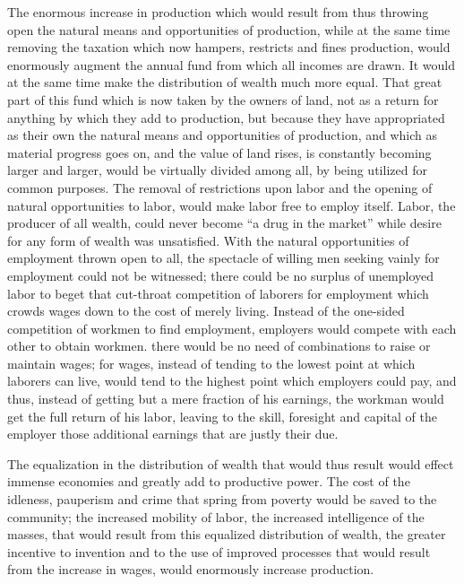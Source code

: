 \documentclass{book}
\begin{document}
The enormous increase in production which would result from thus throwing open the natural means and opportunities of production, while at the same time removing the taxation which now hampers, restricts and fines production, would enormously augment the annual fund from which all incomes are drawn. It would at the same time make the distribution of wealth much more equal. That great part of this fund which is now taken by the owners of land, not as a return for anything by which they add to production, but because they have appropriated as their own the natural means and opportunities of production, and which as material progress goes on, and the value of land rises, is constantly becoming larger and larger, would be virtually divided among all, by being utilized for common purposes. The removal of restrictions upon labor and the opening of natural opportunities to labor, would make labor free to employ itself. Labor, the producer of all wealth, could never become “a drug in the market” while desire for any form of wealth was unsatisfied. With the natural opportunities of employment thrown open to all, the spectacle of willing men seeking vainly for employment could not be witnessed; there could be no surplus of unemployed labor to beget that cut-throat competition of laborers for employment which crowds wages down to the cost of merely living. Instead of the one-sided competition of workmen to find employment, employers would compete with each other to obtain workmen. there would be no need of combinations to raise or maintain wages; for wages, instead of tending to the lowest point at which laborers can live, would tend to the highest point which employers could pay, and thus, instead of getting but a mere fraction of his earnings, the workman would get the full return of his labor, leaving to the skill, foresight and capital of the employer those additional earnings that are justly their due.

The equalization in the distribution of wealth that would thus result would effect immense economies and greatly add to productive power. The cost of the idleness, pauperism and crime that spring from poverty would be saved to the community; the increased mobility of labor, the increased intelligence of the masses, that would result from this equalized distribution of wealth, the greater incentive to invention and to the use of improved processes that would result from the increase in wages, would enormously increase production.
\end{document}
